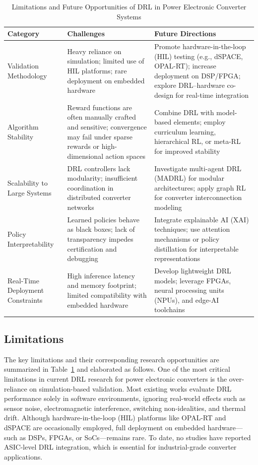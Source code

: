 \begin{table}[t]
\centering
\caption{Limitations and Future Opportunities of DRL in Power Electronic Converter Systems}
\label{tab:limitations}
\renewcommand{\arraystretch}{1.2}
\begin{tabular}{p{3.2cm}|p{6.5cm}|p{6.5cm}}
\hline
\textbf{Category} & \textbf{Challenges} & \textbf{Future Directions} \\
\hline
Validation Methodology & Heavy reliance on simulation; limited use of HIL platforms; rare deployment on embedded hardware & Promote hardware-in-the-loop (HIL) testing (e.g., dSPACE, OPAL-RT); increase deployment on DSP/FPGA; explore DRL--hardware co-design for real-time integration \\
\hline
Algorithm Stability & Reward functions are often manually crafted and sensitive; convergence may fail under sparse rewards or high-dimensional action spaces & Combine DRL with model-based elements; employ curriculum learning, hierarchical RL, or meta-RL for improved stability \\
\hline
Scalability to Large Systems & DRL controllers lack modularity; insufficient coordination in distributed converter networks & Investigate multi-agent DRL (MADRL) for modular architectures; apply graph RL for converter interconnection modeling \\
\hline
Policy Interpretability & Learned policies behave as black boxes; lack of transparency impedes certification and debugging & Integrate explainable AI (XAI) techniques; use attention mechanisms or policy distillation for interpretable representations \\
\hline
Real-Time Deployment Constraints & High inference latency and memory footprint; limited compatibility with embedded hardware & Develop lightweight DRL models; leverage FPGAs, neural processing units (NPUs), and edge-AI toolchains \\
\hline
\end{tabular}
\end{table}

\subsection{Limitations}

The key limitations and their corresponding research opportunities are summarized in Table~\ref{tab:limitations} and elaborated as follows. One of the most critical limitations in current DRL research for power electronic converters is the over-reliance on simulation-based validation. Most existing works evaluate DRL performance solely in software environments, ignoring real-world effects such as sensor noise, electromagnetic interference, switching non-idealities, and thermal drift. Although hardware-in-the-loop (HIL) platforms like OPAL-RT and dSPACE are occasionally employed, full deployment on embedded hardware—such as DSPs, FPGAs, or SoCs—remains rare. To date, no studies have reported ASIC-level DRL integration, which is essential for industrial-grade converter applications.

